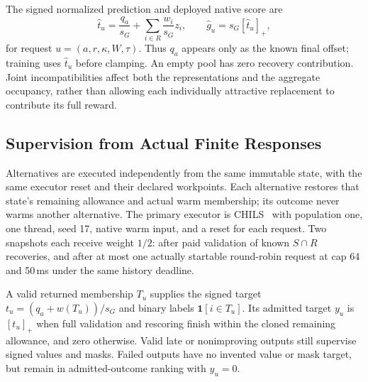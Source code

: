 The signed normalized prediction and deployed native score are
\begin{equation}
 \widehat t_u=\frac{q_a}{s_G}+\sum_{i\in R}\frac{w_i}{s_G}z_i,
 \qquad \widehat g_u=s_G[\widehat t_u]_+,
 \label{eq:v4-prediction}
\end{equation}
for request $u=(a,r,\kappa,W,\tau)$. Thus $q_a$ appears only as the known
final offset; training uses $\widehat t_u$ before clamping. An empty pool
has zero recovery contribution. Joint incompatibilities affect both the
representations and the aggregate occupancy, rather than allowing each
individually attractive replacement to contribute its full reward.

\subsection{Supervision from Actual Finite Responses}
\label{sec:v4-supervision}
Alternatives are executed independently from the same immutable state,
with the same executor reset and their declared workpoints. Each alternative
restores that state's remaining allowance and actual warm membership;
its outcome never warms another alternative. The primary executor is
CHILS~\cite{grossmann2025chils} with population one, one thread, seed 17,
native warm input, and a reset for each request. Two snapshots each receive
weight $1/2$: after paid validation of known $S\cap R$ recoveries, and
after at most one actually startable round-robin request at cap 64 and
50\,ms under the same history deadline.

A valid returned membership $T_u$ supplies the signed target
$t_u=(q_a+w(T_u))/s_G$ and binary labels $\mathbf1[i\in T_u]$. Its
admitted target $y_u$ is $[t_u]_+$ when full validation and rescoring finish
within the cloned remaining allowance, and zero otherwise. Valid late or
nonimproving outputs still supervise signed values and masks. Failed outputs
have no invented value or mask target, but remain in admitted-outcome
ranking with $y_u=0$.

